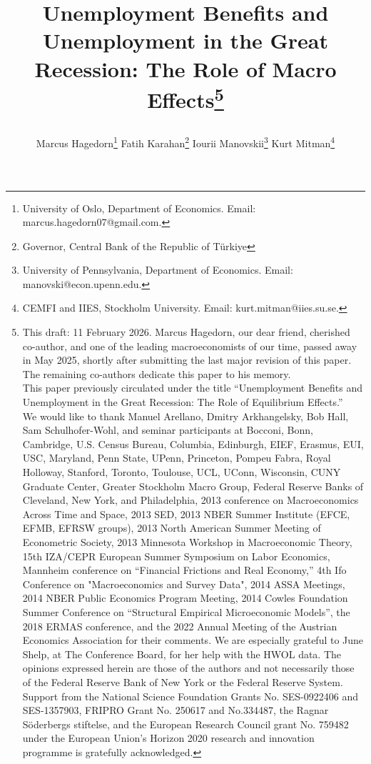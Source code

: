 \documentclass[12pt]{article}
\renewcommand{\baselinestretch}{1.5}
\newcommand{\1}{\mathbf{1}}
\begin{document}
\renewcommand{\baselinestretch}{1}

\title{{ Unemployment Benefits and Unemployment in the Great Recession: The Role of Macro Effects\footnote{This draft: 11 February 2026.
Marcus Hagedorn, our dear friend, cherished co-author, and one of the leading macroeconomists of our time, passed away in May 2025, shortly after submitting the last major revision of this paper. The remaining co-authors dedicate this paper to his memory.\\
\indent This paper previously circulated under the title ``Unemployment Benefits and Unemployment in the Great Recession: The Role of Equilibrium Effects.''\\
\indent We would like to thank Manuel Arellano, Dmitry Arkhangelsky, Bob Hall, Sam Schulhofer-Wohl, and seminar participants at Bocconi, Bonn, Cambridge, U.S. Census Bureau, Columbia, Edinburgh, EIEF, Erasmus, EUI, USC, Maryland, Penn State, UPenn, Princeton, Pompeu Fabra, Royal Holloway, Stanford, Toronto, Toulouse, UCL, UConn, Wisconsin, CUNY Graduate Center, Greater Stockholm Macro Group, Federal Reserve Banks of Cleveland, New York, and Philadelphia, 2013 conference on Macroeconomics Across Time and Space, 2013 SED, 2013 NBER Summer Institute (EFCE, EFMB, EFRSW groups), 2013 North American Summer Meeting of Econometric Society, 2013 Minnesota Workshop in Macroeconomic Theory, 15th IZA/CEPR European Summer Symposium on Labor Economics, Mannheim conference on ``Financial Frictions and Real Economy,'' 4th Ifo Conference on "Macroeconomics and Survey Data", 2014 ASSA Meetings, 2014 NBER Public Economics Program Meeting, 2014 Cowles Foundation Summer Conference on ``Structural Empirical Microeconomic Models'', the 2018 ERMAS conference, and the 2022 Annual Meeting of the Austrian Economics Association for their comments. We are especially grateful to June Shelp, at The Conference Board, for her help with the HWOL data. The opinions expressed herein are those of the authors and not necessarily those of the Federal Reserve Bank of New York or the Federal Reserve System. Support from the National Science Foundation Grants No. SES-0922406 and SES-1357903, FRIPRO Grant No. 250617 and No.334487, the Ragnar S\"oderbergs stiftelse, and the European Research Council grant No. 759482 under the European Union's Horizon 2020 research and innovation programme is gratefully acknowledged.}}
\author{Marcus Hagedorn\thanks{University of Oslo, Department of Economics. Email: marcus.hagedorn07@gmail.com.} \hspace{0.5cm} Fatih Karahan\thanks{Governor, Central Bank of the Republic of T\"{u}rkiye} 
\hspace{0.5cm} Iourii Manovskii\thanks{University of Pennsylvania, Department of Economics.  Email: manovski@econ.upenn.edu.} 
\hspace{0.5cm} Kurt Mitman\thanks{CEMFI and IIES, Stockholm University. Email: kurt.mitman@iies.su.se.}}}
\date{}
\maketitle
\thispagestyle{empty}
\end{document}
